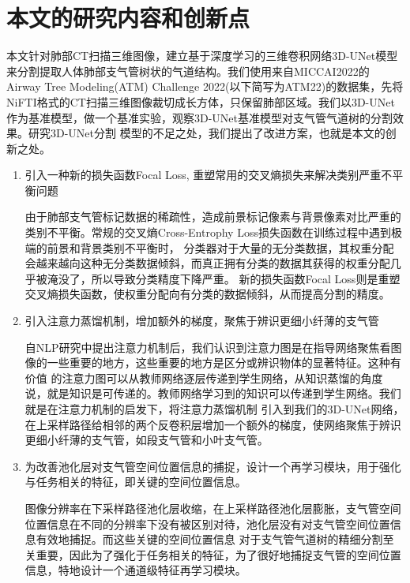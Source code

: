 \section{本文的研究内容和创新点}

本文针对肺部CT扫描三维图像，建立基于深度学习的三维卷积网络3D-UNet模型\cite{ronneberger2015u}来分割提取人体肺部支气管树状的气道结构。我们使用来自MICCAI2022的
Airway Tree Modeling(ATM) Challenge 2022(以下简写为ATM22\cite{Zhang2022CFDA, Qin2019AirwayNet, Yu2022Bronchi, Zhang2021Airway})的数据集，先将
NiFTI格式的CT扫描三维图像裁切成长方体，只保留肺部区域。我们以3D-UNet作为基准模型，做一个基准实验，观察3D-UNet基准模型对支气管气道树的分割效果。研究3D-UNet分割
模型的不足之处，我们提出了改进方案，也就是本文的创新之处。

\begin{enumerate}

\item {\kaishu 引入一种新的损失函数Focal Loss, 重塑常用的交叉熵损失来解决类别严重不平衡问题}

由于肺部支气管标记数据的稀疏性，造成前景标记像素与背景像素对比严重的类别不平衡。常规的交叉熵Cross-Entrophy Loss损失函数在训练过程中遇到极端的前景和背景类别不平衡时，
分类器对于大量的无分类数据，其权重分配会越来越向这种无分类数据倾斜，而真正拥有分类的数据其获得的权重分配几乎被淹没了，所以导致分类精度下降严重。
新的损失函数Focal Loss则是重塑交叉熵损失函数，使权重分配向有分类的数据倾斜，从而提高分割的精度。

\item {\kaishu 引入注意力蒸馏机制，增加额外的梯度，聚焦于辨识更细小纤薄的支气管}

自NLP研究中提出注意力机制\cite{NIPS2017Attention}后，我们认识到注意力图是在指导网络聚焦看图像的一些重要的地方，这些重要的地方是区分或辨识物体的显著特征。这种有价值
的注意力图可以从教师网络逐层传递到学生网络，从知识蒸馏的角度说，就是知识是可传递的。教师网络学习到的知识可以传递到学生网络。我们就是在注意力机制的启发下，将注意力蒸馏机制
引入到我们的3D-UNet网络，在上采样路径给相邻的两个反卷积层增加一个额外的梯度，使网络聚焦于辨识更细小纤薄的支气管，如段支气管和小叶支气管。

\item {\kaishu 为改善池化层对支气管空间位置信息的捕捉，设计一个再学习模块，用于强化与任务相关的特征，即关键的空间位置信息。}

图像分辨率在下采样路径池化层收缩，在上采样路径池化层膨胀，支气管空间位置信息在不同的分辨率下没有被区别对待，池化层没有对支气管空间位置信息有效地捕捉。而这些关键的空间位置信息
对于支气管气道树的精细分割至关重要，因此为了强化于任务相关的特征，为了很好地捕捉支气管的空间位置信息，特地设计一个通道级特征再学习模块。

\end{enumerate}


